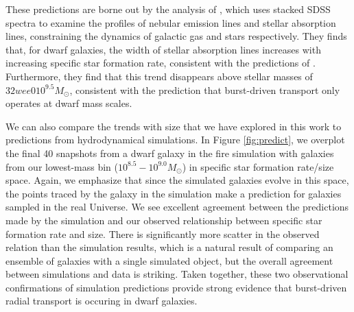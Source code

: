 \documentclass[iop]{emulateapj}
\begin{document}
These predictions are borne out by the analysis of \cite{Cicone16}, which uses stacked SDSS spectra to examine the profiles of nebular emission lines and stellar absorption lines, constraining the dynamics of galactic gas and stars respectively. They finds that, for dwarf galaxies, the width of stellar absorption lines increases with increasing specific star formation rate, consistent with the predictions of \cite{El-Badry17}. Furthermore, they find that this trend disappears above stellar masses of $32wee010^{9.5} M_{\odot}$, consistent with the prediction that burst-driven transport only operates at dwarf mass scales.

We can also compare the trends with size that we have explored in this work to predictions from hydrodynamical simulations. In Figure \ref{fig:predict}, we overplot the final 40 snapshots from a dwarf galaxy in the fire simulation with galaxies from our lowest-mass bin ($10^{8.5}-10^{9.0} M_{\odot}$) in specific star formation rate/size space. Again, we emphasize that since the simulated galaxies evolve in this space, the points traced by the galaxy in the simulation make a prediction for galaxies sampled in the real Universe. We see excellent agreement between the predictions made by the simulation and our observed relationship between specific star formation rate and size. There is significantly more scatter in the observed relation than the simulation results, which is a natural result of comparing an ensemble of galaxies with a single simulated object, but the overall agreement between simulations and data is striking. Taken together, these two observational confirmations of simulation predictions provide strong evidence that burst-driven radial transport is occuring in dwarf galaxies.
\end{document}
